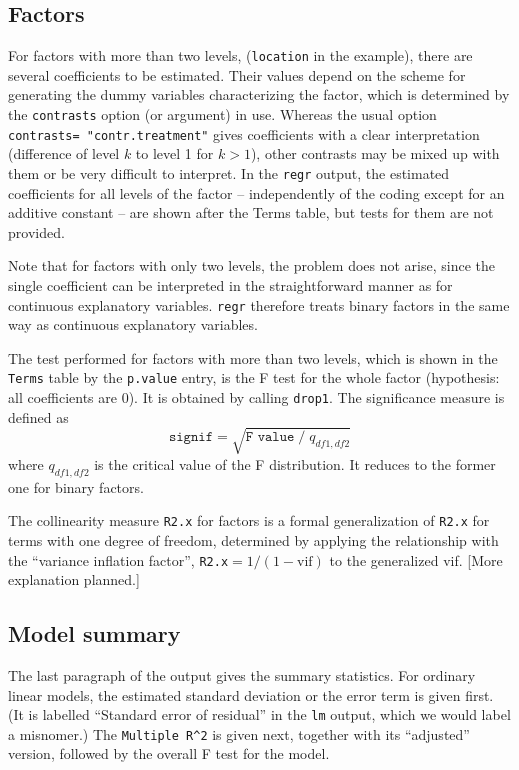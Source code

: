 \documentclass{article}
\providecommand{\T}{\texttt}
\providecommand{\Hneed}[1]{\penalty-8000\hskip#1 plus10pt\penalty-8000\hskip-#1}
\begin{document}
\subsection{Factors}
For factors with more than two levels, (\T{location} in the example), there
are several coefficients to be estimated. 
Their values depend on the scheme for generating the 
dummy variables characterizing the factor, which is determined 
by the \T{contrasts} option (or argument) in use.
Whereas the usual option %
\T{contrasts=%
"contr.treatment"} gives coefficients
with a clear interpretation (difference of level $k$ to level 1 for $k>1$),
other contrasts may be mixed up with them or be very difficult to
interpret.
In the \T{regr} output, the estimated coefficients for all levels of the
factor -- independently of the coding except for an additive constant --
are shown after the Terms table, but tests for them are not provided. 

Note that for factors with only two levels, the problem does not arise,
since the single 
coefficient can be interpreted in the straightforward manner as 
for continuous explanatory variables. \T{regr} therefore treats binary
factors in the same way as continuous explanatory variables.

The test performed for factors with more than two levels, which is shown 
in the \T{Terms} table by the \T{p.value} entry, 
is the F test for the whole factor (hypothesis: all coefficients are 0). 
It is obtained by calling \T{drop1}.
The significance measure is defined as 
\[
  \T{signif} = \sqrt{\T{F value}\;/\;q_{df1,df2}}
\]
where $q_{df1,df2}$ is the critical value of the F distribution.
It reduces to the former one for binary factors.

The collinearity measure \T{R2.x} for factors is a formal generalization of 
\T{R2.x} for terms with one degree of freedom, determined by applying
the relationship with the ``variance inflation factor'',
\T{R2.x}$=1/(1-\mbox{vif})$ to the generalized vif. 
[More explanation planned.]

\subsection{Model summary}
The last paragraph of the output gives the summary statistics.
For ordinary linear models, the estimated standard deviation or the error
term is given first. (It is labelled ``Standard error of residual'' in the 
\T{lm} output, which we would label a misnomer.)
The \T{Multiple R\^{}2} is given next, together with its ``adjusted''
version, followed by the overall F test for the model.
\end{document}
